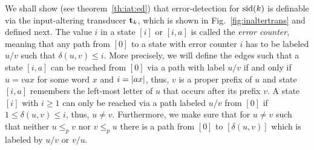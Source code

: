 \documentclass{article}
\theoremstyle{plain}
\theoremstyle{definition}
\theoremstyle{remark}
\newcommand{\abs}[1]{\left|\mathinner{#1}\right|}
\newcommand\tsid{\trt_{k}}
\newcommand\dsid{\ensuremath{\delta}\xspace}
\begin{document}
We shall show (see theorem~\ref{th:iat:ed}) that error-detection for $\mathrm{sid}(k)$ is definable via the input-altering transducer
$\tsid$, which is shown in Fig.~\ref{fig:inaltertrans} and
defined next.
The value $i$ in a state $[i]$ or $[i,a]$ is called the {\em error counter}, meaning that any path from $[0]$ to a state with error counter $i$ has to be labeled $u\slash v$ such that $\dsid(u,v) \le i$.
More precisely, we will define the edges such that a state $[i,a]$ can be reached from $[0]$ via a path with label  $u\slash v$ if and only if $u = vax$ for some word $x$ and $i = \abs{ax}$, thus, $v$ is a proper prefix of $u$ and state $[i,a]$ remembers the left-most letter of $u$ that occurs after its prefix $v$.
A state $[i]$ with $i\ge 1$ can only be reached via a path labeled $u\slash v$ from $[0]$ if
$1\le \dsid(u,v) \le i$, thus, $u\neq v$.
Furthermore, we make sure that for $u\neq v$ such that neither $u\le_p v$ nor $v\le_p u$ there is a path from $[0]$ to $[\dsid(u,v)]$ which is labeled by $u\slash v$ or $v\slash u$.
\end{document}
